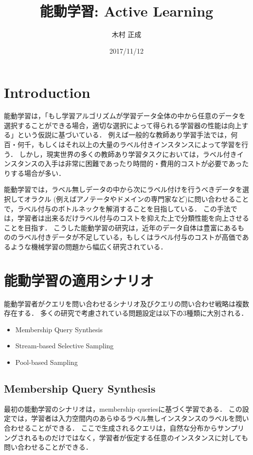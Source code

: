 \documentclass[11pt]{report}
\begin{document}
\begin{titlepage}
\title{能動学習: Active Learning}
\date{2017/11/12}
\author{木村 正成}
\maketitle
\thispagestyle{empty}
\end{titlepage}

\tableofcontents
\clearpage

\section{Introduction}

能動学習は，「もし学習アルゴリズムが学習データ全体の中から任意のデータを選択することができる場合，適切な選択によって得られる学習器の性能は向上する」という仮説に基づいている．
例えば一般的な教師あり学習手法では，何百・何千，もしくはそれ以上の大量のラベル付きインスタンスによって学習を行う．
しかし，現実世界の多くの教師あり学習タスクにおいては，ラベル付きインスタンスの入手は非常に困難であったり時間的・費用的コストが必要であったりする場合が多い．

能動学習では，ラベル無しデータの中から次にラベル付けを行うべきデータを選択してオラクル (例えばアノテータやドメインの専門家など)に問い合わせることで，ラベル付与のボトルネックを解消することを目指している．
この手法では，学習者は出来るだけラベル付与のコストを抑えた上で分類性能を向上させることを目指す．
こうした能動学習の研究は，近年のデータ自体は豊富にあるもののラベル付きデータが不足している，もしくはラベル付与のコストが高価であるような機械学習の問題から幅広く研究されている．

\section{能動学習の適用シナリオ}
能動学習者がクエリを問い合わせるシナリオ及びクエリの問い合わせ戦略は複数存在する\cite{settles2010active}．
多くの研究で考慮されている問題設定は以下の3種類に大別される．

\begin{itemize}
    \item Membership Query Synthesis
    \item Stream-based Selective Sampling
    \item Pool-based Sampling
\end{itemize}

\subsection{Membership Query Synthesis}
最初の能動学習のシナリオは，membership queries\cite{angluin1988queries}に基づく学習である．
この設定では，学習者は入力空間内のあらゆるラベル無しインスタンスのラベルを問い合わせることができる．
ここで生成されるクエリは，自然な分布からサンプリングされるものだけではなく，学習者が仮定する任意のインスタンスに対しても問い合わせることができる．
\end{document}
